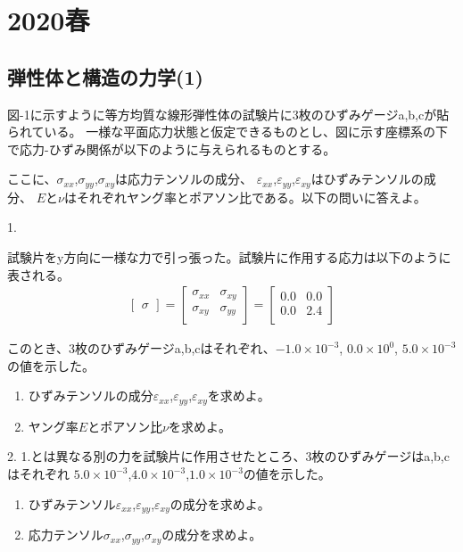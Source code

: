 \newpage
\section{2020春}
\setcounter{yearcounter}{2020}

\subsection{弾性体と構造の力学(1)}
図-1に示すように等方均質な線形弾性体の試験片に3枚のひずみゲージa,b,cが貼られている。
一様な平面応力状態と仮定できるものとし、図に示す座標系の下で応力-ひずみ関係が以下のように与えられるものとする。


ここに、$\sigma_{xx}$,$\sigma_{yy}$,$\sigma_{xy}$は応力テンソルの成分、
$\varepsilon_{xx}$,$\varepsilon_{yy}$,$\varepsilon_{xy}$はひずみテンソルの成分、
$E$と$\nu$はそれぞれヤング率とポアソン比である。以下の問いに答えよ。

1.

試験片をy方向に一様な力で引っ張った。試験片に作用する応力は以下のように表される。
\begin{align*}%
  \begin{bmatrix}
    \sigma 
  \end{bmatrix}
  =
  \begin{bmatrix}
    \sigma_{xx}&\sigma_{xy}\\
    \sigma_{xy}&\sigma_{yy}\\
  \end{bmatrix}
  =
  \begin{bmatrix}
    0.0& 0.0\\
    0.0& 2.4\\
  \end{bmatrix}
\end{align*}

このとき、3枚のひずみゲージa,b,cはそれぞれ、$-1.0 \times 10^{-3}$, $0.0 \times 10^0$, $5.0 \times 10^{-3}$の値を示した。
\begin{enumerate}[(1)]
  \item ひずみテンソルの成分$\varepsilon_{xx}$,$\varepsilon_{yy}$,$\varepsilon_{xy}$を求めよ。
  \item ヤング率$E$とポアソン比$\nu$を求めよ。
\end{enumerate}

2.
1.とは異なる別の力を試験片に作用させたところ、3枚のひずみゲージはa,b,cはそれぞれ
$5.0\times10^{-3}$,$4.0\times10^{-3}$,$1.0\times10^{-3}$の値を示した。
\begin{enumerate}
  \item ひずみテンソル$\varepsilon_{xx}$,$\varepsilon_{yy}$,$\varepsilon_{xy}$の成分を求めよ。
  \item 応力テンソル$\sigma_{xx}$,$\sigma_{yy}$,$\sigma_{xy}$の成分を求めよ。
\end{enumerate}

